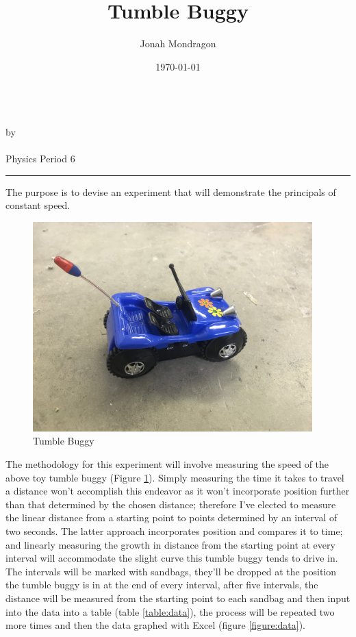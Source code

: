 \documentclass[12pt]{article}
\newcommand{\PutTitle}[1]
{ \begin{center}
        {\huge\bfseries\thetitle}\\
        by \theauthor\\
        \thedate\\
        #1        
    \end{center}
    \hrule
    \vspace{2ex}
}
\begin{document}
\title{Tumble Buggy}
\author{Jonah Mondragon}
\date{\today}
\PutTitle{Physics Period 6}

\doublespacing

The purpose is to devise an experiment that will demonstrate the principals of
constant speed.

\begin{figure}[h]
    \centering
    \includegraphics[width=4.25in]{tumble_buggy.jpg}
    \caption{Tumble Buggy}
    \label{figure:buggy}
\end{figure}

The methodology for this experiment will involve measuring the speed of the
above toy tumble buggy (Figure \ref{figure:buggy}). Simply measuring the time it
takes to travel a distance won't accomplish this endeavor as it won't
incorporate position further than that determined by the chosen distance;
therefore I've elected to measure the linear distance from a starting point to
points determined by an interval of two seconds. The latter approach
incorporates position and compares it to time; and linearly measuring the growth
in distance from the starting point at every interval will accommodate the
slight curve this tumble buggy tends to drive in. The intervals will be marked
with sandbags, they'll be dropped at the position the tumble buggy is in at the
end of every interval, after five intervals, the distance will be measured from
the starting point to each sandbag and then input into the data into a table
(table \ref{table:data}), the process will be repeated two more times and then
the data graphed with Excel (figure \ref{figure:data}).
\end{document}
